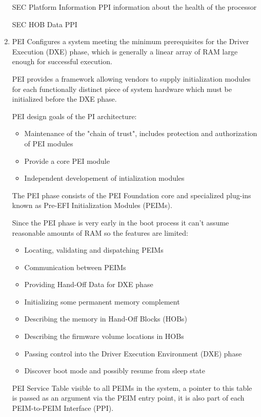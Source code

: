 \begin{enumerate}
    SEC Platform Information PPI
    information about the health of the processor

    SEC HOB Data PPI

    \item{\acf{PEI}}
    Configures a system meeting the minimum prerequisites for the Driver Execution (DXE) phase, which is generally a linear array of RAM large enough for successful execution.

    PEI provides a framework allowing vendors to supply initialization modules for each functionally distinct piece of system hardware which must be initialized before the DXE phase.

    PEI design goals of the PI architecture:
    \begin{itemize}
        \item Maintenance of the "chain of trust", includes protection and authorization of PEI modules
        \item Provide a core PEI module
        \item Independent developement of intialization modules
    \end{itemize}
    The PEI phase consists of the PEI Foundation core and specialized plug-ins known as Pre-EFI Initialization Modules (PEIMs).

    Since the PEI phase is very early in the boot process it can't assume reasonable amounts of RAM so the features are limited:
    \begin{itemize}
        \item Locating, validating and dispatching PEIMs
        \item Communication between PEIMs
        \item Providing Hand-Off Data for DXE phase
        \item Initializing some permanent memory complement
        \item Describing the memory in Hand-Off Blocks (HOBs)
        \item Describing the firmware volume locations in HOBs
        \item Passing control into the Driver Execution Environment (DXE) phase
        \item Discover boot mode and possibly resume from sleep state
    \end{itemize}
    PEI Service Table visible to all PEIMs in the system, a pointer to this table is passed as an argument via the PEIM entry point, it is also part of each PEIM-to-PEIM Interface (PPI).



\end{enumerate}
